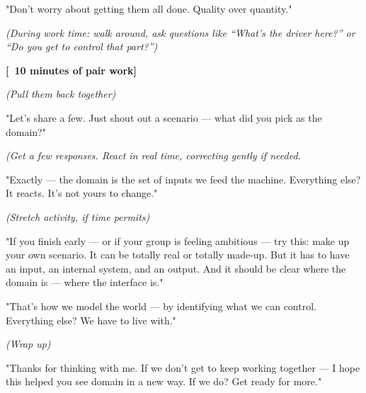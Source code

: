 \documentclass[12pt]{article}
\begin{document}
"Don’t worry about getting them all done. Quality over quantity."

\textit{(During work time: walk around, ask questions like “What’s the driver here?” or “Do you get to control that part?”)}

\textbf{[~10 minutes of pair work]} 

\textit{(Pull them back together)}

"Let’s share a few. Just shout out a scenario — what did you pick as the domain?"

\textit{(Get a few responses. React in real time, correcting gently if needed.}

"Exactly — the domain is the set of inputs we feed the machine. Everything else? It reacts. It’s not yours to change."

\textit{(Stretch activity, if time permits)}

"If you finish early — or if your group is feeling ambitious — try this: make up your own scenario. It can be totally real or totally made-up. But it has to have an input, an internal system, and an output. And it should be clear where the domain is — where the interface is."

"That’s how we model the world — by identifying what we can control. Everything else? We have to live with."

\textit{(Wrap up)}

"Thanks for thinking with me. If we don’t get to keep working together — I hope this helped you see domain in a new way. If we do? Get ready for more."
\end{document}
